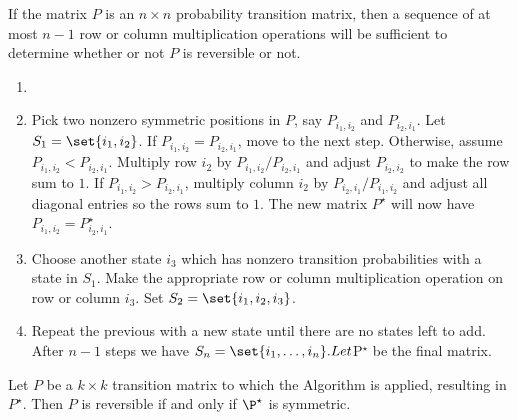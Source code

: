 \documentclass[12pt]{article}
\begin{document}
If the matrix $P$ is an $n \times n$ probability transition matrix, then a sequence of at
most $n - 1$ row or column multiplication operations will be sufficient to determine
whether or not $P$ is reversible or not.
\begin{enumerate}
\item 
\item Pick two nonzero symmetric positions in $P$, say $P_{i_1,i_2}$ and $P_{i_2,i_1}$. Let $S_1 =
\set{i_1, i_2}$. If $P_{i_1,i_2} = P_{i_2,i_1}$, move to the next step. Otherwise, assume $P_{i_1,i_2 }< P_{i_2,i_1}$.
Multiply row $i_2$ by $P_{i_1,i_2}/P_{i_2,i_1}$ and adjust $P_{i_2,i_2}$ to make the row sum to $1$. If
$P_{i_1,i_2} > P_{i_2,i_1}$, multiply column $i_2$ by $P_{i_2,i_1}/P_{i_1,i_2}$ and adjust all diagonal entries so
 the rows sum to $1$. The new matrix $P^{\star}$ will now have $P_{i_1,i_2} = P_{i_2,i_1}^{\star}$.
\item Choose another state $i_3$ which has nonzero transition probabilities with a state
in $S_1$. Make the appropriate row or column multiplication operation on row or
column $i_3$. Set $S_2 = \set{i_1, i_2, i_3}$.
\item  Repeat the previous with a new state until there are no states
  left to add. After $n - 1$
steps we have $S_n = \set{i_1, \dots, i_n}. Let $P$^{\star}$ be the
final matrix.
\end{enumerate}

\begin{theorem}
  Let $P$ be a $k \times k$ transition matrix to which the Algorithm
  is applied, resulting in $P^{\star}$.  Then $P$ is reversible if and
  only if $\P^{\star}$ is symmetric.
\end{theorem}
\end{document}
